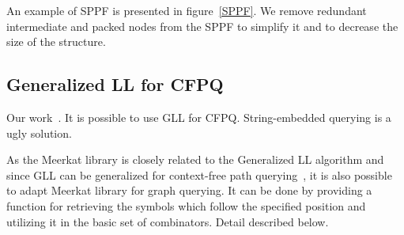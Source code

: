 An example of SPPF is presented in figure~\ref{SPPF}. We remove redundant intermediate and packed nodes from the SPPF to simplify it and to decrease the size of the structure.



\subsection{Generalized LL for CFPQ}

Our work~\cite{GrigorevR16}. 
It is possible to use GLL for CFPQ.
String-embedded querying is a ugly solution. 

As the Meerkat library is closely related to the Generalized LL algorithm and since GLL can be generalized for context-free path querying~\cite{GrigorevR16}, it is also possible to adapt Meerkat library for graph querying. 
It can be done by providing a function for retrieving the symbols which follow the specified position and utilizing it in the basic set of combinators.
Detail described below.
